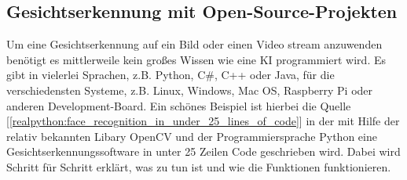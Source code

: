     \subsection{Gesichtserkennung mit Open-Source-Projekten}
        Um eine Gesichtserkennung auf ein Bild oder einen Video stream anzuwenden benötigt es mittlerweile kein großes Wissen wie eine KI programmiert wird. Es gibt in vielerlei Sprachen, z.B. Python, C#, C++ oder Java, für die verschiedensten Systeme, z.B. Linux, Windows, Mac OS, Raspberry Pi oder anderen Development-Board. Ein schönes Beispiel ist hierbei die Quelle [\ref{realpython:face_recognition_in_under_25_lines_of_code}] in der mit Hilfe der relativ bekannten Libary OpenCV und der Programmiersprache Python eine Gesichtserkennungssoftware in unter 25 Zeilen Code geschrieben wird. Dabei wird Schritt für Schritt erklärt, was zu tun ist und wie die Funktionen funktionieren.
